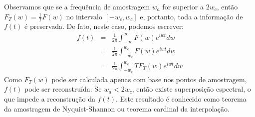 \begin{obs}Observamos que se a frequência de amostragem $w_a$ for superior a $2w_c$, então $F_T(w)=\frac{1}{T}F(w)$ no intervalo $[-w_c,w_c]$ e, portanto, toda a informação de $f(t)$ é preservada. De fato, neste caso, podemos escrever:
\begin{eqnarray*}
f(t)&=&\frac{1}{2\pi}\int_{-\infty}^\infty F(w)e^{iwt}dw\\
&=&\frac{1}{2\pi}\int_{-w_c}^{w_c} F(w)e^{iwt}dw\\
&=&\frac{1}{2\pi}\int_{-w_c}^{w_c} TF_T(w)e^{iwt}dw
\end{eqnarray*}
Como $F_T(w)$ pode ser calculada apenas com base nos pontos de amostragem, $f(t)$ pode ser reconstruída. Se $w_a<2w_c$, então existe superposição espectral, o que impede a reconstrução da $f(t)$. Este resultado é conhecido como teorema da amostragem de Nyquist-Shannon ou teorema cardinal da interpolação.
\end{obs}

